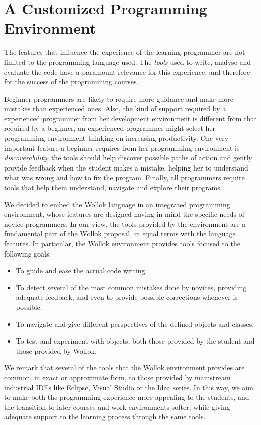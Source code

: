 \section{A Customized Programming Environment}
\label{sec:environment}

The features that influence the experience of the learning programmer are not limited to the programming language used. 
The \emph{tools} used to write, analyse and evaluate the code have a paramount relevance for this experience, and therefore for the success of the programming courses.

Beginner programmers are likely to require more guidance and make more mistakes than experienced ones.
Also, the kind of support required by a experienced programmer from her development environment is different from that required by a beginner, \eg an experienced programmer might select her programming environment thinking on increasing productivity.
One very important feature a beginner requires from her programming environment is \emph{discoverability}, \ie the tools should help discover possible paths of action and gently provide feedback when the student makes a mistake, helping her to understand what was wrong and how to fix the program.
Finally, all programmers require tools that help them understand, navigate and explore their programs.

We decided to embed the Wollok language in an integrated programming environment, whose features are designed having in mind the specific needs of novice programmers.
In our view. the tools provided by the environment are a fundamental part of the Wollok proposal, in equal terms with the language features.
In particular, the Wollok environment provides tools focused to the following goals:
\begin{itemize}
\item To guide and ease the actual code writing.
\item To detect several of the most common mistakes done by novices, providing adequate feedback, and even to provide possible corrections whenever is possible.
\item To navigate and give different perspectives of the defined objects and classes.
\item To test and experiment with objects, both those provided by the student and those provided by Wollok.
\end{itemize}

	We remark that several of the tools that the Wollok environment provides are common, in exact or approximate form, to those provided by mainstream industrial IDEs like Eclipse, Visual Studio or the Idea series. In this way, we aim to make both the programming experience more appealing to the students, and the transition to later courses and work environments softer; while giving adequate support to the learning process through the same tools.



